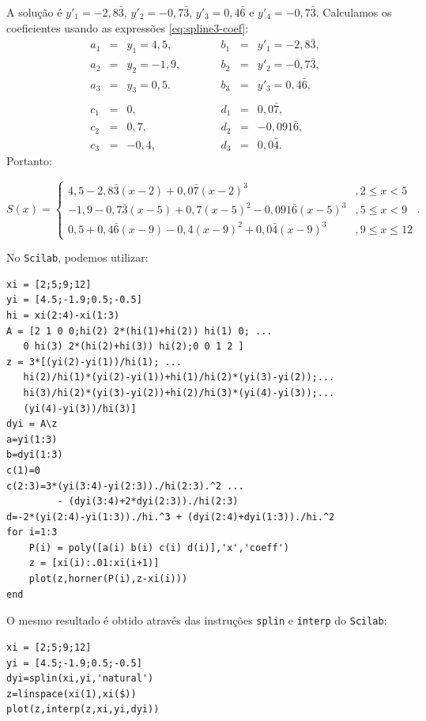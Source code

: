 \begin{sol}
A solução é  $y'_1=-2,8\bar{3}$, $y'_2=-0,7\bar{3}$, $y'_3=0,4\bar{6}$ e $y'_4=-0,7\bar{3}$. Calculamos os coeficientes usando as expressões \eqref{eq:spline3-coef}:
\begin{equation}
	\begin{array}{lclclcl}
		a_1&=&y_1=4,5,& \qquad&b_1 &=&y'_1=-2,8\bar{3}, \\
		a_2&=&y_2=-1,9,& \qquad&b_2&=&y'_2=-0,7\bar{3}, \\
		a_3&=&y_3=0,5.& \qquad&b_3&=&y'_3=0,4\bar{6}, \\
		&&&&&&\\
		c_1&=&0,& \qquad&d_1&=&0,0\bar{7}, \\
		c_2&=&0,7,& \qquad&d_2&=&-0,091\bar{6}, \\
		c_3&=&-0,4,& \qquad&d_3&=&0,0\bar{4}.
	\end{array}
\end{equation}
Portanto:
\begin{small}
	\begin{equation}
		S(x)=\left\{\begin{array}{ll}
			4,5-2,8\bar{3}(x-2)+0,0\bar{7}(x-2)^3 &\!, 2\leq x<5\\
			-1,9-0,7\bar{3}(x-5)+0,7(x-5)^2-0,091\bar{6}(x-5)^3 &\!, 5\leq x<9\\
			0,5+0,4\bar{6}(x-9)-0,4(x-9)^2+0,0\bar{4}(x-9)^3 &\!, 9\leq x\leq 12
		\end{array}\right. .
	\end{equation}
\end{small}

\ifisscilab
No \verb+Scilab+, podemos utilizar:
\begin{verbatim}
xi = [2;5;9;12]
yi = [4.5;-1.9;0.5;-0.5]
hi = xi(2:4)-xi(1:3)
A = [2 1 0 0;hi(2) 2*(hi(1)+hi(2)) hi(1) 0; ...
   0 hi(3) 2*(hi(2)+hi(3)) hi(2);0 0 1 2 ]
z = 3*[(yi(2)-yi(1))/hi(1); ...
   hi(2)/hi(1)*(yi(2)-yi(1))+hi(1)/hi(2)*(yi(3)-yi(2));...
   hi(3)/hi(2)*(yi(3)-yi(2))+hi(2)/hi(3)*(yi(4)-yi(3));...
   (yi(4)-yi(3))/hi(3)]
dyi = A\z
a=yi(1:3)
b=dyi(1:3)
c(1)=0
c(2:3)=3*(yi(3:4)-yi(2:3))./hi(2:3).^2 ...
         - (dyi(3:4)+2*dyi(2:3))./hi(2:3)
d=-2*(yi(2:4)-yi(1:3))./hi.^3 + (dyi(2:4)+dyi(1:3))./hi.^2
for i=1:3
    P(i) = poly([a(i) b(i) c(i) d(i)],'x','coeff')
    z = [xi(i):.01:xi(i+1)]
    plot(z,horner(P(i),z-xi(i)))
end
\end{verbatim}

O mesmo resultado é obtido através das instruções \verb+splin+ e \verb+interp+ do \verb+Scilab+:
\begin{verbatim}
xi = [2;5;9;12]
yi = [4.5;-1.9;0.5;-0.5]
dyi=splin(xi,yi,'natural')
z=linspace(xi(1),xi($))
plot(z,interp(z,xi,yi,dyi))
\end{verbatim}
\fi
\end{sol}

